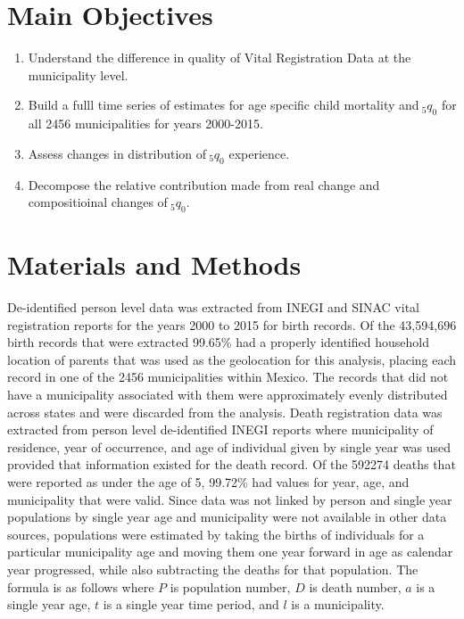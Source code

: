\documentclass[a0,portrait]{a0poster}
\begin{document}
\begin{multicols}{2}

\color{black} %

\section*{Main Objectives}

\begin{enumerate}
\item Understand the difference in quality of Vital Registration Data at the municipality level.
\item Build a fulll time series of estimates for age specific child mortality and$~_{5}q_{0}$ for all 2456 municipalities for years 2000-2015.
\item Assess changes in distribution of$~_{5}q_{0}$ experience.
\item Decompose the relative contribution made from real change and compositioinal changes of$~_{5}q_{0}$.
\end{enumerate}


\section*{Materials and Methods}

De-identified person level data was extracted from INEGI and SINAC vital registration reports for the years 2000 to 2015 for birth records. Of the 43,594,696 birth records that were extracted 99.65\% had a properly identified household location of parents that was used as the geolocation for this analysis, placing each record in one of the 2456 municipalities within Mexico. The records that did not have a municipality associated with them were approximately evenly distributed across states and were discarded from the analysis. Death registration data was extracted from person level de-identified INEGI reports where municipality of residence, year of occurrence, and age of individual given by single year was used provided that information existed for the death record. Of the 592274 deaths that were reported as under the age of 5, 99.72\% had values for year, age, and municipality that were valid. Since data was not linked by person and single year populations by single year age and municipality were not available in other data sources, populations were estimated by taking the births of individuals for a particular municipality age and moving them one year forward in age as calendar year progressed, while also subtracting the deaths for that population. The formula is as follows where $P$ is population number, $D$ is death number, $a$ is a single year age, $t$ is a single year time period, and $l$ is a municipality.


\end{multicols}
\end{document}

